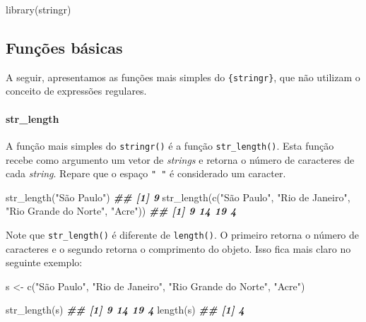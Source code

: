 \documentclass[
]{book}
\newenvironment{Shaded}{\begin{snugshade}}{\end{snugshade}}
\newcommand{\DocumentationTok}[1]{\textcolor[rgb]{0.56,0.35,0.01}{\textbf{\textit{#1}}}}
\newcommand{\FunctionTok}[1]{\textcolor[rgb]{0.00,0.00,0.00}{#1}}
\newcommand{\NormalTok}[1]{#1}
\newcommand{\OtherTok}[1]{\textcolor[rgb]{0.56,0.35,0.01}{#1}}
\newcommand{\StringTok}[1]{\textcolor[rgb]{0.31,0.60,0.02}{#1}}
\begin{document}
\begin{Shaded}
\begin{Highlighting}[]
\FunctionTok{library}\NormalTok{(stringr)}
\end{Highlighting}
\end{Shaded}

\hypertarget{funuxe7uxf5es-buxe1sicas}{%
\subsection{Funções básicas}\label{funuxe7uxf5es-buxe1sicas}}

A seguir, apresentamos as funções mais simples do \texttt{\{stringr\}}, que não utilizam o conceito de expressões regulares.

\hypertarget{str_length}{%
\paragraph*{str\_length}\label{str_length}}

A função mais simples do \texttt{stringr()} é a função \texttt{str\_length()}. Esta função recebe como argumento um vetor de \emph{strings} e retorna o número de caracteres de cada \emph{string}. Repare que o espaço \texttt{"\ "} é considerado um caracter.

\begin{Shaded}
\begin{Highlighting}[]
\FunctionTok{str\_length}\NormalTok{(}\StringTok{"São Paulo"}\NormalTok{)}
\DocumentationTok{\#\# [1] 9}
\FunctionTok{str\_length}\NormalTok{(}\FunctionTok{c}\NormalTok{(}\StringTok{"São Paulo"}\NormalTok{, }\StringTok{"Rio de Janeiro"}\NormalTok{, }
             \StringTok{"Rio Grande do Norte"}\NormalTok{, }\StringTok{"Acre"}\NormalTok{))}
\DocumentationTok{\#\# [1]  9 14 19  4}
\end{Highlighting}
\end{Shaded}

Note que \texttt{str\_length()} é diferente de \texttt{length()}. O primeiro retorna o número de caracteres e o segundo retorna o comprimento do objeto. Isso fica mais claro no seguinte exemplo:

\begin{Shaded}
\begin{Highlighting}[]
\NormalTok{s }\OtherTok{\textless{}{-}} \FunctionTok{c}\NormalTok{(}\StringTok{"São Paulo"}\NormalTok{, }\StringTok{"Rio de Janeiro"}\NormalTok{, }
       \StringTok{"Rio Grande do Norte"}\NormalTok{, }\StringTok{"Acre"}\NormalTok{)}

\FunctionTok{str\_length}\NormalTok{(s)}
\DocumentationTok{\#\# [1]  9 14 19  4}
\FunctionTok{length}\NormalTok{(s)}
\DocumentationTok{\#\# [1] 4}
\end{Highlighting}
\end{Shaded}
\end{document}
